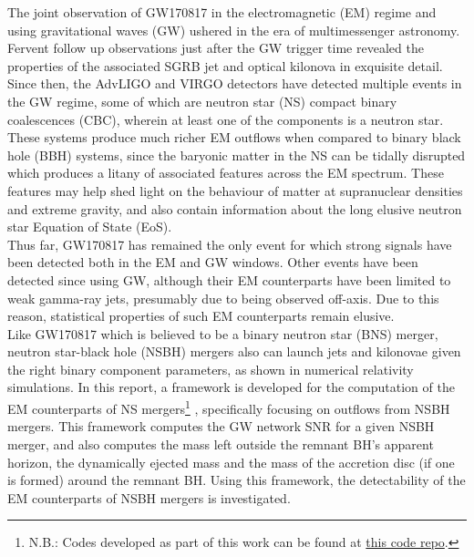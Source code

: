 The joint observation of GW170817 in the electromagnetic (EM) regime and using
gravitational waves (GW) ushered in the era of multimessenger astronomy. Fervent follow
up observations just after the GW trigger time revealed the properties of the associated
SGRB jet and optical kilonova in exquisite detail. Since then, the AdvLIGO and VIRGO
detectors have detected multiple events in the GW regime, some of which are neutron star
(NS) compact binary coalescences (CBC), wherein at least one of the components is a
neutron star.\\
These systems produce much richer EM outflows when compared to binary black hole (BBH)
systems, since the baryonic matter in the NS can be tidally disrupted which produces a
litany of associated features across the EM spectrum. These features may help shed light
on the behaviour of matter at supranuclear densities and extreme gravity, and also
contain information about the long elusive neutron star Equation of State (EoS).\\
Thus far, GW170817 has remained the only event for which strong signals have been
detected both in the EM and GW windows. Other events have been detected since using GW,
although their EM counterparts have been limited to weak gamma-ray jets, presumably due
to being observed off-axis. Due to this reason, statistical properties of such EM
counterparts remain elusive.\\
Like GW170817 which is believed to be a binary neutron star (BNS) merger, neutron
star-black hole (NSBH) mergers also can launch jets and kilonovae given the right binary
component parameters, as shown in numerical relativity simulations. In this report, a
framework is developed for the computation of the EM counterparts of NS mergers\footnote
{
    N.B.: Codes developed as part of this work can be found at
    \href{https://github.com/BSGalvan/nsbh-codes}{this code repo}.
}
, specifically focusing on outflows from NSBH mergers. This framework computes the
GW network SNR for a given NSBH merger, and also computes the mass left outside the
remnant BH's apparent horizon, the dynamically ejected mass and the mass of the
accretion disc (if one is formed) around the remnant BH. Using this framework, the
detectability of the EM counterparts of NSBH mergers is investigated.
